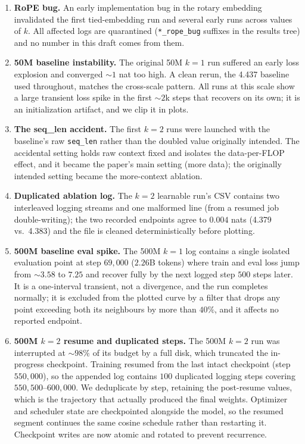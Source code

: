 \documentclass[11pt]{article}
\begin{document}
\begin{enumerate}
  \item \textbf{RoPE bug.} An early implementation bug in the rotary
        embedding invalidated the first tied-embedding run and several early
        runs across values of $k$. All affected logs are quarantined
        (\texttt{*\_rope\_bug} suffixes in the results tree) and no number
        in this draft comes from them.
  \item \textbf{50M baseline instability.} The original 50M $k{=}1$ run
        suffered an early loss explosion and converged ${\sim}1$ nat too
        high. A clean rerun, the 4.437 baseline used throughout, matches the
        cross-scale pattern. All runs at this scale show a large transient
        loss spike in the first ${\sim}2$k steps that recovers on its own;
        it is an initialization artifact, and we clip it in plots.
  \item \textbf{The seq\_len accident.} The first $k{=}2$ runs were
        launched with the baseline's raw \texttt{seq\_len} rather than the
        doubled value originally intended. The accidental setting holds raw
        context fixed and isolates the data-per-FLOP effect, and it became
        the paper's main setting (more data); the originally intended
        setting became the more-context ablation.
  \item \textbf{Duplicated ablation log.} The $k{=}2$ learnable run's CSV
        contains two interleaved logging streams and one malformed line
        (from a resumed job double-writing); the two recorded endpoints
        agree to $0.004$ nats (4.379 vs.\ 4.383) and the file is cleaned
        deterministically before plotting.
  \item \textbf{500M baseline eval spike.} The 500M $k{=}1$ log contains a
        single isolated evaluation point at step $69{,}000$ ($2.26$B tokens)
        where train and eval loss jump from ${\sim}3.58$ to $7.25$ and
        recover fully by the next logged step $500$ steps later. It is a
        one-interval transient, not a divergence, and the run completes
        normally; it is excluded from the plotted curve by a filter that
        drops any point exceeding both its neighbours by more than $40\%$,
        and it affects no reported endpoint.
  \item \textbf{500M $k{=}2$ resume and duplicated steps.} The 500M $k{=}2$
        run was interrupted at ${\sim}98\%$ of its budget by a full disk,
        which truncated the in-progress checkpoint. Training resumed from the
        last intact checkpoint (step $550{,}000$), so the appended log
        contains $100$ duplicated logging steps covering
        $550{,}500$--$600{,}000$. We deduplicate by step, retaining the
        post-resume values, which is the trajectory that actually produced
        the final weights. Optimizer and scheduler state are checkpointed
        alongside the model, so the resumed segment continues the same cosine
        schedule rather than restarting it. Checkpoint writes are now atomic
        and rotated to prevent recurrence.
\end{enumerate}
\end{document}

